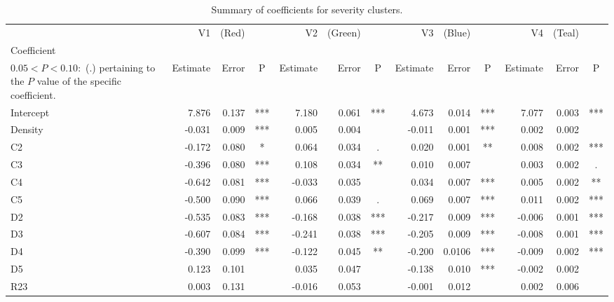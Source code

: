 \documentclass[11pt,letterpaper]{article}
\numberwithin{equation}{section}
\numberwithin{equation}{section}
\numberwithin{equation}{section}
\begin{document}
\begin{center}
\begin{table}
\caption{ Summary of coefficients for severity clusters.}
\label{severity_coef_table}
\begin{tabular}{|l|rrc|rrc|rrc|rrc|}
\hline\hline
         & V1         & (Red)     &    & V2         & (Green)   &    & V3          & (Blue)     &    & V4          & (Teal)     &    \\
Coefficient \footnote{The significance codes are defined as $  P < 0.001 : $  (***), $0.001 < P < 0.01:$ (**), $  0.01 < P < 0.05:$ (*),\\ $0.05 < P < 0.10 : $ (.) %
pertaining to the $P$ value of the specific coefficient.}      & Estimate   & Error     & P   & Estimate   & Error     & P   & Estimate    & Error      & P   & Estimate    & Error      & P   \\ \hline
Intercept & 7.876  & 0.137 & *** & 7.180  & 0.061 & *** & 4.673   & 0.014 & *** & 7.077  & 0.003 & *** \\
Density   & -0.031 & 0.009 & *** & 0.005  & 0.004 &     & -0.011 & 0.001 & *** & 0.002  & 0.002 &     \\
C2        & -0.172 & 0.080 & *   & 0.064  & 0.034 & .   & 0.020 & 0.001 & **  & 0.008  & 0.002 & *** \\
C3        & -0.396 & 0.080 & *** & 0.108  & 0.034 & **  & 0.010  & 0.007 &     & 0.003  & 0.002 & .   \\
C4        & -0.642 & 0.081 & *** & -0.033 & 0.035 &     & 0.034  & 0.007 & *** & 0.005  & 0.002 & **  \\
C5        & -0.500 & 0.090 & *** & 0.066 & 0.039 & .   & 0.069  & 0.007 & *** & 0.011  & 0.002 & *** \\
D2        & -0.535 & 0.083 & *** & -0.168 & 0.038 & *** & -0.217 & 0.009 & *** & -0.006 & 0.001 & *** \\
D3        & -0.607  & 0.084 & *** & -0.241 & 0.038 & *** & -0.205 & 0.009 & *** & -0.008 & 0.001 & *** \\
D4        & -0.390 & 0.099 & *** & -0.122 & 0.045 & **  & -0.200 & 0.0106 & *** & -0.009  & 0.002 & *** \\
D5        & 0.123 & 0.101 &     & 0.035  & 0.047 &     & -0.138 & 0.010 & *** & -0.002 & 0.002 &     \\
R23       & 0.003 & 0.131  &     & -0.016 & 0.053 &     & -0.001 & 0.012 &     & 0.002  & 0.006 &     \\

\end{tabular}
\end{table}
\end{center}
\end{document}
